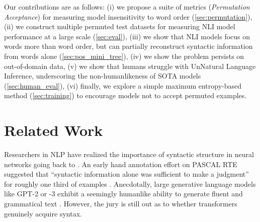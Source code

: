\documentclass[11pt,a4paper]{article}
\newcommand{\PermAcc}{Permutation Acceptance} %
\begin{document}
Our contributions are as follows: 
(i) we propose a suite of metrics (\textit{\PermAcc}) for measuring model insensitivity to word order (\autoref{sec:permutation}), 
(ii) we construct multiple permuted test datasets for measuring NLI model performance at a large scale (\autoref{sec:eval}),
(iii) we show that NLI models focus on words more than word order, but can partially reconstruct syntactic information from words alone (\autoref{sec:pos_mini_tree}), %
(iv) we show the problem persists on out-of-domain data,
(v) we show that humans struggle with UnNatural Language Inference, underscoring the non-humanlikeness of SOTA models (\autoref{sec:human_eval}),
(vi) finally, we explore a simple maximum entropy-based method (\autoref{sec:training}) to encourage models not to accept permuted examples.




\section{Related Work}

Researchers in NLP have realized the importance of syntactic structure in neural networks going back to . An early hand annotation effort on PASCAL RTE \citep{dagan-etal-2006} suggested that ``syntactic information alone was sufficient to make a judgment'' for roughly one third of examples %
\citep{vanderwende2005syntax}. %
Anecdotally, large generative language models like GPT-2 or -3 exhibit a seemingly humanlike ability to generate fluent and grammatical text \citep{goldberg2019assessing, wolf2019some}. 
However, the jury is still out as to whether transformers genuinely acquire syntax.
\end{document}
